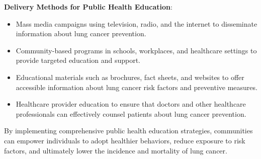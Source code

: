 \vspace{1em}
\textbf{Delivery Methods for Public Health Education}:
\begin{itemize}
    \item Mass media campaigns using television, radio, and the internet to disseminate information 
    about lung cancer prevention.
    \item Community-based programs in schools, workplaces, and healthcare settings to provide 
    targeted education and support.
    \item Educational materials such as brochures, fact sheets, and websites to offer accessible 
    information about lung cancer risk factors and preventive measures.
    \item Healthcare provider education to ensure that doctors and other healthcare professionals 
    can effectively counsel patients about lung cancer prevention.
\end{itemize}

By implementing comprehensive public health education strategies, communities can empower 
individuals to adopt healthier behaviors, reduce exposure to risk factors, and ultimately lower the 
incidence and mortality of lung cancer.
